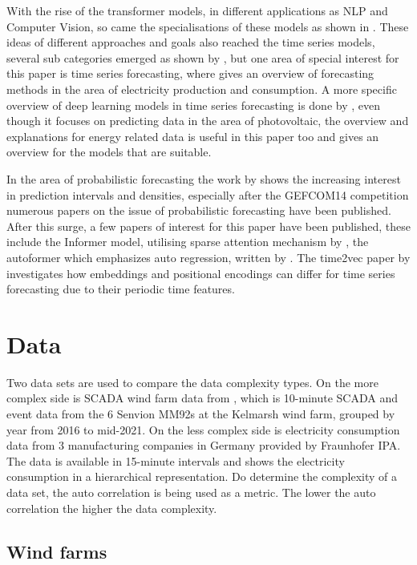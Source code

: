 \documentclass{article}
\begin{document}
With the rise of the transformer models, in different applications as NLP and Computer Vision, so came the specialisations of these models as shown in \cite{Transformer-Survey}. These ideas of different approaches and goals also reached the time series models, several sub categories emerged as shown by \cite{Transformer-TS-Survey}, but one area of special interest for this paper is time series forecasting, where \cite{forecasting-overview} gives an overview of forecasting methods in the area of electricity production and consumption. A more specific overview of deep learning models in time series forecasting is done by \cite{Transformer-TS-PV}, even though it focuses on predicting data in the area of photovoltaic, the overview and explanations for energy related data is useful in this paper too and gives an overview for the models that are suitable. \par 
In the area of probabilistic forecasting the work by \cite{Prob-Forecast-Overview} shows the increasing interest in prediction intervals and densities, especially after the GEFCOM14 competition numerous papers on the issue of probabilistic forecasting have been published. After this surge, a few papers of interest for this paper have been published, these include the Informer model, utilising sparse attention mechanism by \cite{Informer}, the autoformer which emphasizes auto regression, written by \cite{autoformer}. The time2vec paper by \cite{time2vec} investigates how embeddings and positional encodings can differ for time series forecasting due to their periodic time features.

\section{Data}

Two data sets are used to compare the data complexity types. On the more complex side is SCADA wind farm data from \cite{Windpark_Data_1}, which is 10-minute SCADA and event data from the 6 Senvion MM92s at the Kelmarsh wind farm, grouped by year from 2016 to mid-2021. On the less complex side is electricity consumption data from 3 manufacturing companies in Germany provided by Fraunhofer IPA. The data is available in 15-minute intervals and shows the electricity consumption in a hierarchical representation.
Do determine the complexity of a data set, the auto correlation is being used as a metric. The lower the auto correlation the higher the data complexity. 

\subsection{Wind farms}
\end{document}
